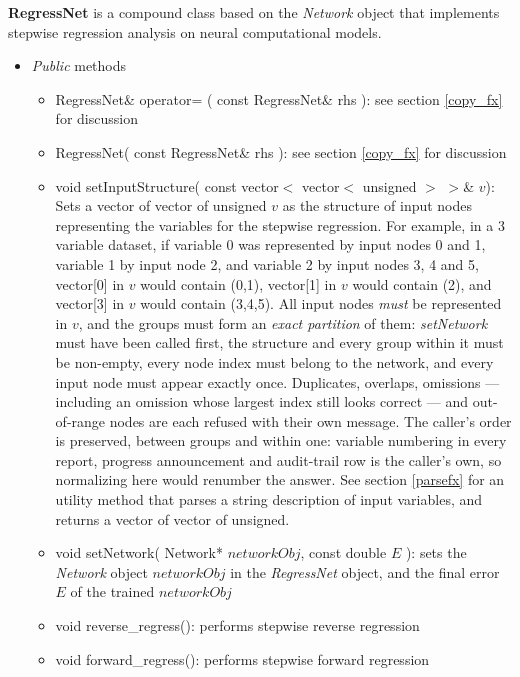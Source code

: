 \documentclass{report}
\begin{document}
{\bf RegressNet} is a compound class based on the {\em Network} object
that implements stepwise regression analysis on neural computational
models.

\begin{itemize}

\item {\em Public} methods

\begin{itemize}
\item RegressNet\& operator= ( const RegressNet\& rhs ): see section
      \ref{copy_fx} for discussion
\item RegressNet( const RegressNet\& rhs ): see section \ref{copy_fx}
      for discussion
\item void setInputStructure( const vector$<$ vector$<$ unsigned $>$
      $>$\& $v$): Sets a vector of vector of unsigned $v$ as the
      structure of input nodes representing the variables for the
      stepwise regression. For example, in a 3 variable dataset, if
      variable 0 was represented by input nodes 0 and 1, variable 1 by
      input node 2, and variable 2 by input nodes 3, 4 and 5,
      vector[0] in $v$ would contain (0,1), vector[1] in $v$ would
      contain (2), and vector[3] in $v$ would contain (3,4,5).  All
      input nodes {\em must} be represented in $v$, and the groups must
      form an {\em exact partition} of them: {\em setNetwork} must have
      been called first, the structure and every group within it must be
      non-empty, every node index must belong to the network, and every
      input node must appear exactly once.  Duplicates, overlaps,
      omissions --- including an omission whose largest index still
      looks correct --- and out-of-range nodes are each refused with
      their own message.  The caller's order is preserved, between
      groups and within one: variable numbering in every report,
      progress announcement and audit-trail row is the caller's own, so
      normalizing here would renumber the answer.  See section
      \ref{parsefx} for an utility method that parses a string
      description
      of input variables, and returns a vector of vector of unsigned.
\item void setNetwork( Network* $networkObj$, const double $E$ ): sets
      the {\em Network} object $networkObj$ in the {\em RegressNet}
      object, and the final error $E$ of the trained $networkObj$
\item void reverse\_regress(): performs stepwise reverse regression
\item void forward\_regress(): performs stepwise forward regression
\end{itemize}


\end{itemize}
\end{document}
